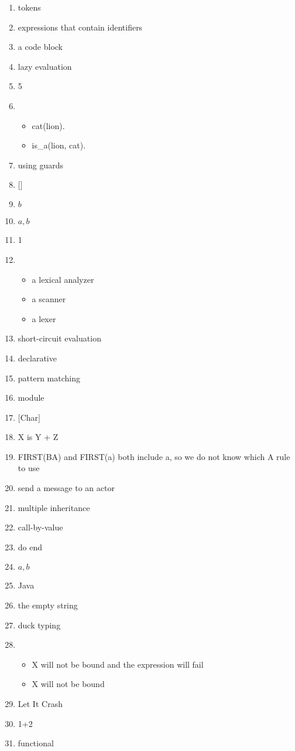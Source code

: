 \documentclass{exam}
\begin{document}
\begin{enumerate}
\item tokens
\item expressions that contain identifiers
\item a code block
\item lazy evaluation
\item 5
\item \begin{itemize}
\item cat(lion).
\item is\_a(lion, cat).
\end{itemize}
\item using guards
\item $\lbrack\rbrack$
\item ${b}$
\item ${a,b}$
\item 1
\item \begin{itemize}
\item a lexical analyzer
\item a scanner
\item a lexer
\end{itemize}
\item short-circuit evaluation
\item declarative
\item pattern matching
\item module
\item $\lbrack$Char$\rbrack$
\item X is Y + Z
\item FIRST(BA) and FIRST(a) both include a, so we do not know which A rule to use
\item send a message to an actor
\item multiple inheritance
\item call-by-value
\item do end
\item ${a,b}$
\item Java
\item the empty string
\item duck typing
\item \begin{itemize}
\item X will not be bound and the expression will fail
\item X will not be bound
\end{itemize}
\item Let It Crash
\item 1+2
\item functional

\end{enumerate}
\end{document}
